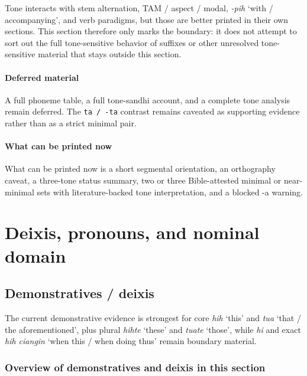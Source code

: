 \documentclass[
  11pt,
  a4paper,
]{article}
\newcommand{\tdim}[1]{\textit{#1}}
\newcommand{\glossquote}[1]{`#1'}
\newcounter{reviewchapter}
\newcommand{\reviewchapterbreak}{\stepcounter{reviewchapter}\setcounter{xnumi}{0}}
\begin{document}
Tone interacts with stem alternation, TAM / aspect / modal, \tdim{-pih}
\glossquote{with / accompanying}, and verb paradigms, but those are
better printed in their own sections. This section therefore only marks
the boundary: it does not attempt to sort out the full tone-sensitive
behavior of suffixes or other unresolved tone-sensitive material that
stays outside this section.

\paragraph{Deferred material}\label{deferred-material}

A full phoneme table, a full tone-sandhi account, and a complete tone
analysis remain deferred. The \texttt{ta\ /\ -ta} contrast remains
caveated as supporting evidence rather than as a strict minimal pair.

\paragraph{What can be printed now}\label{what-can-be-printed-now}

What can be printed now is a short segmental orientation, an orthography
caveat, a three-tone status summary, two or three Bible-attested minimal
or near-minimal sets with literature-backed tone interpretation, and a
blocked -a warning.

\reviewchapterbreak

\section{Deixis, pronouns, and nominal
domain}\label{deixis-pronouns-and-nominal-domain}

\subsection{Demonstratives / deixis}\label{demonstratives-deixis}

The current demonstrative evidence is strongest for core \tdim{hih}
\glossquote{this} and \tdim{tua} \glossquote{that / the aforementioned},
plus plural \tdim{hihte} \glossquote{these} and \tdim{tuate}
\glossquote{those}, while \tdim{hi} and exact \tdim{hih ciangin}
\glossquote{when this / when doing thus} remain boundary material.

\subsubsection{Overview of demonstratives and deixis in this
section}\label{overview-of-demonstratives-and-deixis-in-this-section}
\end{document}
